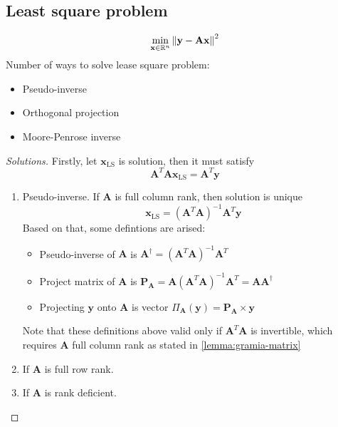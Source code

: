 \documentclass[11pt,a4paper]{article}
\begin{document}
\subsection{Least square problem}%
\label{sub:least_square_problem}

\begin{lemma}
    \[
    \min_{\mathbf{x}\in \mathbb{R}^{n}} \left\lVert\mathbf{y} - \mathbf{A}\mathbf{x}\right\rVert^2
    \] 
   Number of ways to solve lease square problem:
   \begin{itemize}[noitemsep]
       \item Pseudo-inverse
       \item Orthogonal projection
       \item Moore-Penrose inverse
   \end{itemize}
   \begin{proof}[Solutions]
       Firstly, let $\mathbf{x}_\text{LS}$ is solution, then it must satisfy
       \[
           \mathbf{A}^T\mathbf{A} \mathbf{x}_\text{LS} = \mathbf{A}^T\mathbf{y}
       \] 

       \begin{enumerate}
           \item Pseudo-inverse. If $\mathbf{A}$ is full column rank, then solution is unique
               \[
                   \mathbf{x}_\text{LS} = (\mathbf{A}^T\mathbf{A})^{-1}\mathbf{A}^T\mathbf{y}
               \] 
               Based on that, some defintions are arised:
               \begin{itemize}
                   \item Pseudo-inverse of $\mathbf{A}$ is $\mathbf{A}^{\dagger} = (\mathbf{A}^T\mathbf{A})^{-1}\mathbf{A}^T$
                   \item Project matrix of $\mathbf{A}$ is $\mathbf{P}_\mathbf{A} = \mathbf{A}(\mathbf{A}^T\mathbf{A})^{-1}\mathbf{A}^T = \mathbf{A}\mathbf{A}^{\dagger}$
                   \item Projecting $\mathbf{y}$ onto $\mathbf{A}$ is vector $\Pi_\mathbf{A}(\mathbf{y}) = \mathbf{P}_\mathbf{A} \times \mathbf{y}$
               \end{itemize}
       Note that these definitions above valid only if $\mathbf{A}^T\mathbf{A}$ is invertible, which requires $\mathbf{A}$ full column rank as stated in \ref{lemma:gramia-matrix}
   \item If $\mathbf{A}$ is full row rank.
   \item If $\mathbf{A}$ is rank deficient.
       \end{enumerate}
   \end{proof}
\end{lemma}
\end{document}
